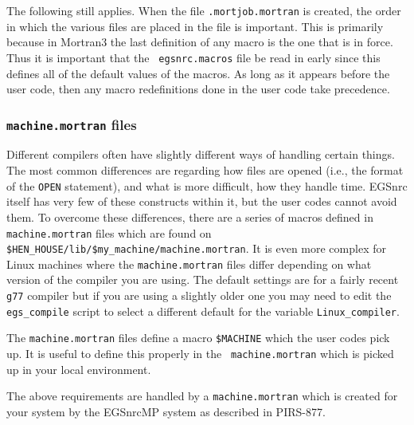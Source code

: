 The following still applies. When the file {\tt .mortjob.mortran} is
created, the order in which the various files are placed in the file is
important.  This is primarily because in Mortran3 the last definition of
any macro is the one that is in force.  Thus it is important that the {\tt
egsnrc.macros} file be read in early since this defines all of the default
values of the macros.  As long as it appears before the user code, then any
macro redefinitions done in the user code take precedence.


\subsubsection{{\tt machine.mortran} files}
Different compilers often have slightly different ways of handling certain
things.  The most common differences are regarding how files are opened
(i.e., the format of the {\tt OPEN} statement), and what is more difficult,
how they handle time.  EGSnrc itself has very few of these constructs
within it, but the user codes cannot avoid them.  To overcome these
differences, there are a series of macros defined in {\tt machine.mortran}
files which are found on {\tt
\$HEN\_HOUSE/lib/\$my\_machine/machine.mortran}.  It is even more complex
for Linux machines where the {\tt machine.mortran} files differ depending
on what version of the compiler you are using.  The default settings are
for a fairly recent {\tt g77} compiler but if you are using a slightly
older one you may need to edit the {\tt egs\_compile} script to select a
different default for the variable {\tt Linux\_compiler}.

The {\tt  machine.mortran} files define a macro {\tt \$MACHINE} which the
user codes pick up. It is useful to define this properly in the {\tt
machine.mortran} which is picked up in your local environment.

The above requirements are handled by a {\tt machine.mortran} which is
created for your system by the EGSnrcMP system as described in PIRS-877.


